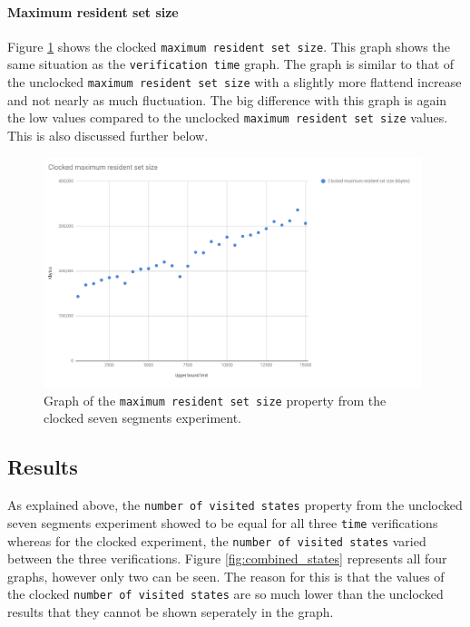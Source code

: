 \paragraph{Maximum resident set size}
Figure \ref{fig:clocked_resident_size} shows the clocked \texttt{maximum resident set size}. This graph shows the same situation as the \texttt{verification time} graph. The graph is similar to that of the unclocked \texttt{maximum resident set size} with a slightly more flattend increase and not nearly as much fluctuation. The big difference with this graph is again the low values compared to the unclocked \texttt{maximum resident set size} values. This is also discussed further below.
\begin{figure}
    \includegraphics[width=0.98\textwidth]{./figures/temporary_graphs/clocked_maximum_resident_set_size.jpg}
\caption{Graph of the \texttt{maximum resident set size} property from the clocked seven segments experiment.}
\label{fig:clocked_resident_size}
\end{figure}
\subsection{Results}
As explained above, the \texttt{number of visited states} property from the unclocked seven segments experiment showed to be equal for all three \texttt{time} verifications whereas for the clocked experiment, the \texttt{number of visited states} varied between the three verifications. Figure \ref{fig:combined_states} represents all four graphs, however only two can be seen. %
The reason for this is that the values of the clocked \texttt{number of visited states} are so much lower than the unclocked results that they cannot be shown seperately in the graph. \\

